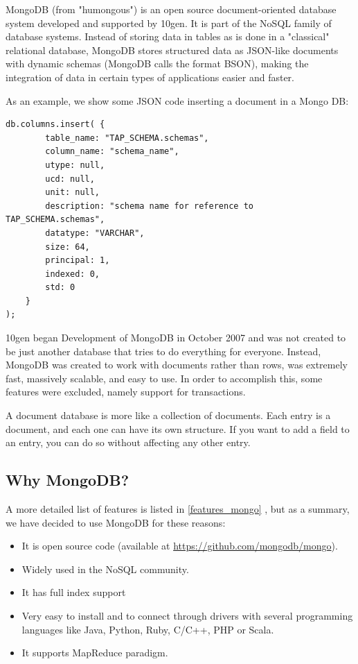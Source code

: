 MongoDB (from "humongous") is an open source document-oriented database system developed and supported by 10gen. It is part of the NoSQL family of database systems. Instead of storing data in tables as is done in a "classical" relational database, MongoDB stores structured data as JSON-like documents with dynamic schemas (MongoDB calls the format BSON), making the integration of data in certain types of applications easier and faster. \newline

As an example, we show some JSON code inserting a document in a Mongo DB:
\begin{lstlisting}
db.columns.insert( {
		table_name: "TAP_SCHEMA.schemas",
		column_name: "schema_name",
		utype: null,
		ucd: null,
		unit: null,
		description: "schema name for reference to TAP_SCHEMA.schemas",
		datatype: "VARCHAR",
		size: 64,
		principal: 1,
		indexed: 0,
		std: 0
	}
);
\end{lstlisting} 


10gen began Development of MongoDB in October 2007 and was not created to be just another database that tries to do everything for everyone. Instead, MongoDB was created to work with documents rather than rows, was extremely fast, massively scalable, and easy to use. In order to accomplish this, some features were excluded, namely support for transactions. \newline

A document database is more like a collection of documents. Each entry is a document, and each one can have its own structure. If you want to add a field to an entry, you can do so without affecting any other entry.



\subsection{Why MongoDB?}

A more detailed list of features is listed in \ref{features_mongo} , but as a summary, we have decided to use MongoDB for these reasons:

\begin{itemize}
\item It is open source code (available at \url{https://github.com/mongodb/mongo}).
\item Widely used in the NoSQL community.
\item It has full index support
\item Very easy to install and to connect through drivers with several programming languages like Java, Python, Ruby, C/C++, PHP or Scala.
\item It supports MapReduce paradigm.
\end{itemize}

